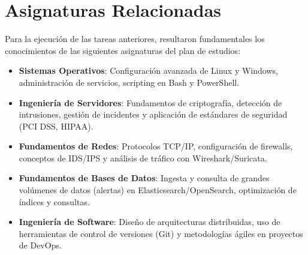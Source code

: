 \section{Asignaturas Relacionadas}
Para la ejecución de las tareas anteriores, resultaron fundamentales los conocimientos de las siguientes asignaturas del plan de estudios:
\begin{itemize}
  \item \textbf{Sistemas Operativos}: Configuración avanzada de Linux y Windows, administración de servicios, scripting en Bash y PowerShell.  
  \item \textbf{Ingeniería de Servidores}: Fundamentos de criptografía, detección de intrusiones, gestión de incidentes y aplicación de estándares de seguridad (PCI DSS, HIPAA).  
  \item \textbf{Fundamentos de Redes}: Protocolos TCP/IP, configuración de firewalls, conceptos de IDS/IPS y análisis de tráfico con Wireshark/Suricata.  
  \item \textbf{Fundamentos de Bases de Datos}: Ingesta y consulta de grandes volúmenes de datos (alertas) en Elasticsearch/OpenSearch, optimización de índices y consultas.  
  \item \textbf{Ingeniería de Software}: Diseño de arquitecturas distribuidas, uso de herramientas de control de versiones (Git) y metodologías ágiles en proyectos de DevOps.  
\end{itemize}